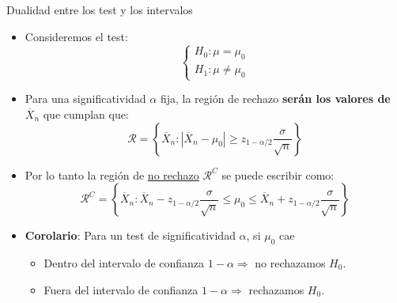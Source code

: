 \documentclass{beamer}
\theoremstyle{definition}
\begin{document}
\begin{frame}{\color{rosee}Dualidad entre los test y los intervalos}\small
\begin{itemize}
\item Consideremos el test:
\[
\begin{cases}
H_{0}: \mu =\mu _{0}\\
H_{1}: \mu \neq \mu _{0}
\end{cases}
\]
\item Para una significatividad $\alpha$ fija, la región de rechazo \textbf{serán los valores de }$\overline{X}_n$ que cumplan que:
$$\mathcal{R} = \left\{\overline{X}_n:|\overline{X}_n-\mu_0| \geq z_{1-\alpha/2}\frac{\sigma}{\sqrt{n}} \right\} $$
\item Por lo tanto la región de \underline{no rechazo} $\mathcal{R}^C$ se puede escribir como:
$$\mathcal{R}^C= \left\{\overline{X}_n:\overline{X}_n -z_{1-\alpha/2}\frac{\sigma}{\sqrt{n}}\leq \mu_0 \leq \overline{X}_n +z_{1 -\alpha/2}\frac{\sigma}{\sqrt{n}} \right\} $$
\item \textbf{Corolario}: Para un test de significatividad $\alpha$, si  $\mu_0$ cae \medskip
\begin{itemize}
\item Dentro del intervalo de confianza $1-\alpha \Rightarrow$ no rechazamos $H_0$.\medskip
\item Fuera del intervalo de confianza $1-\alpha \Rightarrow$ rechazamos $H_0$.
\end{itemize}
\end{itemize}
\end{frame}
\end{document}
